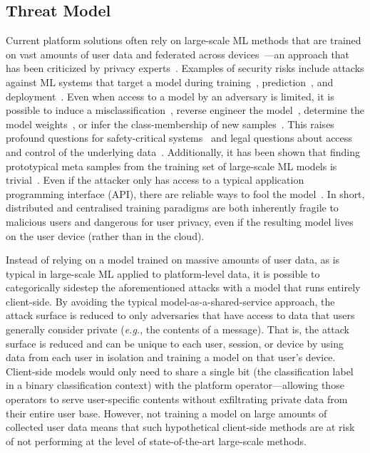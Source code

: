 \documentclass[preprint,12pt]{elsarticle}
\begin{document}
\subsection{Threat Model}
\label{threat}
Current platform solutions often rely on large-scale ML methods that are trained on vast amounts of user data and federated across devices~\cite{apple_csam}---an approach that has been criticized by privacy experts~\cite{abelson2024bugs}. 
Examples of security risks include attacks against ML systems that target a model during training~\cite{biggio_poisoning_2013}, prediction~\cite{biggio_evasion_2013,deepfool,carlini_towards_2017}, and deployment~\cite{distributed_attacks,santos2021universal}. 
Even when access to a model by an adversary is limited, it is possible to induce a misclassification~\cite{hopskipjump}, reverse engineer the model~\cite{extraction_attack}, determine the model weights~\cite{jagielski2020high}, or infer the class-membership of new samples~\cite{bentley2020quantifying}. 
This raises profound questions for safety-critical systems~\cite{meyers} and legal questions about access and control of the underlying data~\cite{mitrou2018data,marks2023ai}.
Additionally, it has been shown that finding prototypical meta samples from the training set of large-scale ML models is trivial~\cite{chakraborty_adversarial_2018}. 
Even if the attacker only has access to a typical application programming interface (API), there are reliable ways to fool the model~\cite{hopskipjump}. 
In short, distributed and centralised training paradigms are both inherently fragile to malicious users and dangerous for user privacy, even if the resulting model lives on the user device (rather than in the cloud). 

Instead of relying on a model trained on massive amounts of user data, as is typical in large-scale ML applied to platform-level data, it is possible to categorically sidestep the aforementioned attacks with a model that runs entirely client-side. 
By avoiding the typical model-as-a-shared-service approach, the attack surface is reduced to only adversaries that have access to data that users generally consider private (\textit{e.g.}, the contents of a message). 
That is, the attack surface is reduced and can be unique to each user, session, or device by using data from each user in isolation and training a model on that user's device. Client-side models would only need to share a single bit (the classification label in a binary classification context) with the platform operator---allowing those operators to serve user-specific contents without exfiltrating private data from their entire user base. 
However, not training a model on large amounts of collected user data means that such hypothetical client-side methods are at risk of not performing at the level of state-of-the-art large-scale methods.
\end{document}
